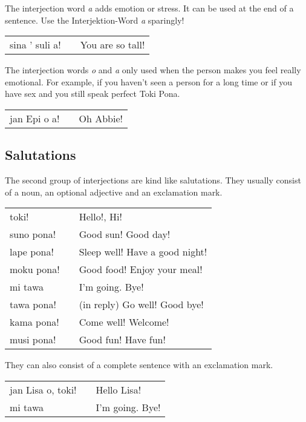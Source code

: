 The interjection word \textit{a} adds emotion or stress. 
It can be used at the end of a sentence.
Use the Interjektion-Word \textit{a} sparingly!

\begin{supertabular}{p{5,5cm}|ll}
sina ' suli a! && You are so tall! \\
\end{supertabular} 

The interjection words \textit{o} and \textit{a} only used when the person makes you feel really emotional. 
For example, if you haven't seen a person for a long time or if you have sex and you still speak perfect Toki Pona. 

\begin{supertabular}{p{5,5cm}|ll}
jan Epi o a! && Oh Abbie! \\
\end{supertabular} 

%
\subsection*{Salutations}
%
%
The second group of interjections are kind like salutations.
They usually consist of a noun, an optional adjective and an exclamation mark. 

\begin{supertabular}{p{5,5cm}|ll}
toki! && Hello!, Hi! \\
suno pona! && Good sun! Good day! \\
lape pona! && Sleep well! Have a good night! \\
moku pona! && Good food! Enjoy your meal! \\
mi tawa && I'm going. Bye! \\
tawa pona! && (in reply) Go well! Good bye! \\
kama pona! && Come well! Welcome! \\
musi pona! && Good fun! Have fun! \\
\end{supertabular}  

They can also consist of a complete sentence with an exclamation mark.

\begin{supertabular}{p{5,5cm}|ll}
jan Lisa o, toki! && Hello Lisa! \\
mi tawa && I'm going. Bye! \\
\end{supertabular}

